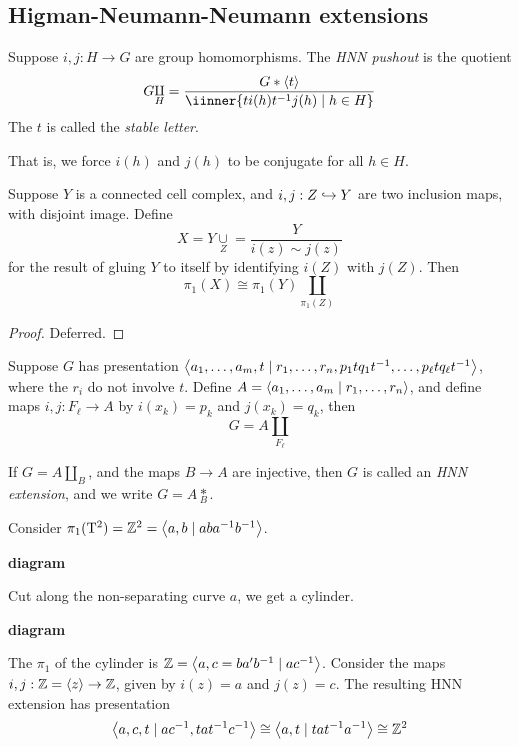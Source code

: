 \documentclass{article}
\begin{document}
\lec

\subsection{Higman-Neumann-Neumann extensions}

\begin{definition}

    Suppose \(i, j : H \to G\) are group homomorphisms. The \emph{HNN pushout} is the quotient
    \[G \underset H \amalg = \frac{G * \inner{t}}{\iinner{ti(h)t^{-1}j(h) \mid h \in H}}\]
    The \(t\) is called the \emph{stable letter}.
\end{definition}
That is, we force \(i(h)\) and \(j(h)\) to be conjugate for all \(h \in H\).
\begin{theorem}
    Suppose \(Y\) is a connected cell complex, and \(i, j : Z \hookrightarrow Y\) are two inclusion maps, with disjoint image. Define
    \[X = Y \underset Z \cup = \frac{Y}{i(z) \sim j(z)}\]
    for the result of gluing \(Y\) to itself by identifying \(i(Z)\) with \(j(Z)\). Then
    \[\pi_1(X) \cong \pi_1(Y) \underset{\pi_1(Z)}{\amalg}\]
\end{theorem}

\begin{proof}
    Deferred.
\end{proof}

\begin{remark}
    Suppose \(G\) has presentation \(\left\langle a_1, \dots, a_m, t \mid r_1, \dots, r_n, p_1tq_1t^{-1}, \dots, p_\ell tq_\ell t^{-1} \right\rangle\), where the \(r_i\) do not involve \(t\). Define \(A = \left\langle a_1, \dots, a_m \mid r_1, \dots, r_n \right\rangle\), and define maps \(i, j : F_\ell \to A\) by \(i(x_k) = p_k\) and \(j(x_k) = q_k\), then
    \[G = A \underset{F_\ell}\amalg\]
\end{remark}

\begin{definition}
     If \(G = A \underset B \amalg\), and the maps \(B \to A\) are injective, then \(G\) is called an \emph{HNN extension}, and we write \(G = A \underset{B}{*}\).
\end{definition}

\begin{example}
    Consider \(\pi_1(\mathrm{T}^2) = \mathbb{Z}^2 = \left\langle a, b \mid aba^{-1}b^{-1} \right\rangle\).

    \textbf{diagram}

    Cut along the non-separating curve \(a\), we get a cylinder.

    \textbf{diagram}

    The \(\pi_1\) of the cylinder is \(\mathbb{Z} = \left\langle a, c = ba'b^{-1} \mid ac^{-1} \right\rangle\). Consider the maps \(i, j : \mathbb{Z} = \left\langle z \right\rangle \to \mathbb{Z}\), given by \(i(z) = a\) and \(j(z) = c\). The resulting HNN extension has presentation
    \[\left\langle a, c, t \mid ac^{-1}, tat^{-1}c^{-1} \right\rangle \cong \left\langle a, t \mid tat^{-1}a^{-1} \right\rangle \cong \mathbb{Z}^2\]
\end{example}
\end{document}
